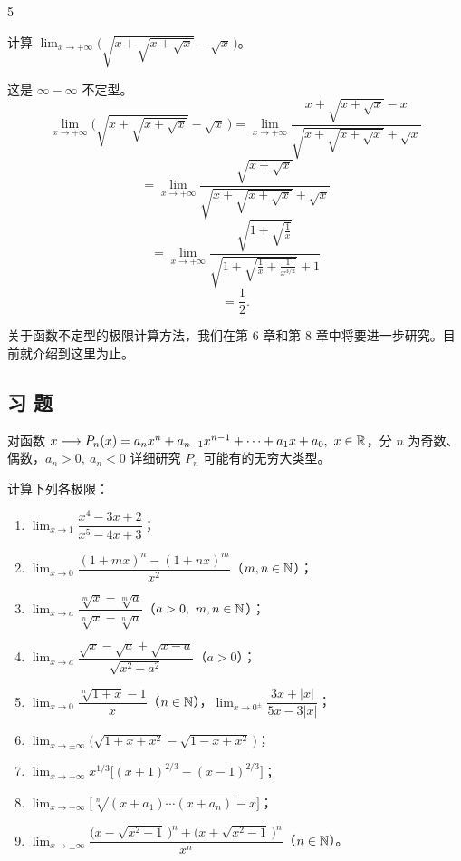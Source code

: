 \begin{sourceexample}{5}

	计算 \(\lim_{x\to+\infty}\bigl(\sqrt{x+\sqrt{x+\sqrt{x}}}-\sqrt{x}\,\bigr)\)。

	这是 \(\infty-\infty\) 不定型。
	\[
	\lim_{x\to+\infty}\bigl(\sqrt{x+\sqrt{x+\sqrt{x}}}-\sqrt{x}\,\bigr)=\lim_{x\to+\infty}\frac{x+\sqrt{x+\sqrt{x}}-x}{\sqrt{x+\sqrt{x+\sqrt{x}}}+\sqrt{x}}
	\]
	\[
	=\lim_{x\to+\infty}\frac{\sqrt{x+\sqrt{x}}}{\sqrt{x+\sqrt{x+\sqrt{x}}}+\sqrt{x}}
	\]
	\[
	=\lim_{x\to+\infty}\frac{\sqrt{1+\sqrt{\frac1x}}}{\sqrt{1+\sqrt{\frac1x+\frac1{x^{3/2}}}}+1}
	\]
	\[
	=\frac12.
	\]

\end{sourceexample}

关于函数不定型的极限计算方法，我们在第 6 章和第 8 章中将要进一步研究。目前就介绍到这里为止。

\subsection*{习 题}

\begin{exercise}
	\item 对函数 \(x\longmapsto P_n(x)=a_nx^n+a_{n-1}x^{n-1}+\cdots+a_1x+a_0,\ x\in\mathbb{R}\)，分 \(n\) 为奇数、偶数，\(a_n>0,\ a_n<0\) 详细研究 \(P_n\) 可能有的无穷大类型。
\end{exercise}

\begin{exercise}
	\item 计算下列各极限：
	\begin{enumerate}[label=\arabic*)]
		\item \(\lim_{x\to1}\dfrac{x^4-3x+2}{x^5-4x+3}\)；
		\item \(\lim_{x\to0}\dfrac{(1+mx)^n-(1+nx)^m}{x^2}\)（\(m,n\in\mathbb{N}\)）；
		\item \(\lim_{x\to a}\dfrac{\sqrt[m]{x}-\sqrt[m]{a}}{\sqrt[n]{x}-\sqrt[n]{a}}\)（\(a>0,\ m,n\in\mathbb{N}\)）；
		\item \(\lim_{x\to a}\dfrac{\sqrt{x}-\sqrt{a}+\sqrt{x-a}}{\sqrt{x^2-a^2}}\)（\(a>0\)）；
		\item \(\lim_{x\to0}\dfrac{\sqrt[n]{1+x}-1}{x}\)（\(n\in\mathbb{N}\)），\quad \(\lim_{x\to0^\pm}\dfrac{3x+|x|}{5x-3|x|}\)；
		\item \(\lim_{x\to\pm\infty}\bigl(\sqrt{1+x+x^2}-\sqrt{1-x+x^2}\,\bigr)\)；
		\item \(\lim_{x\to+\infty}x^{1/3}\bigl[(x+1)^{2/3}-(x-1)^{2/3}\bigr]\)；
		\item \(\lim_{x\to+\infty}\bigl[\sqrt[n]{(x+a_1)\cdots(x+a_n)}-x\bigr]\)；
		\item \(\lim_{x\to\pm\infty}\dfrac{\bigl(x-\sqrt{x^2-1}\,\bigr)^n+\bigl(x+\sqrt{x^2-1}\,\bigr)^n}{x^n}\)（\(n\in\mathbb{N}\)）。
	\end{enumerate}
\end{exercise}

